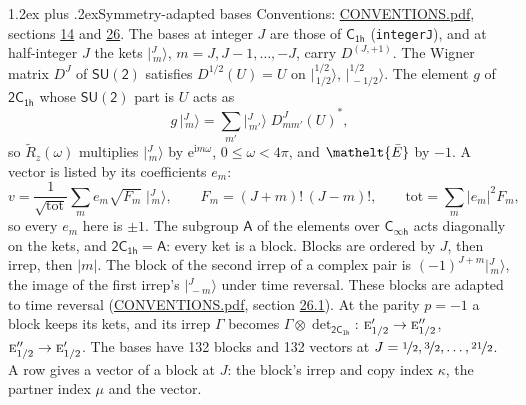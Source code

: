 \documentclass[10pt,a4paper]{article}
\makeatletter
\renewcommand\section{\@startsection{section}{1}{\z@}{-3ex plus -1ex minus -.2ex}%
  {1.2ex plus .2ex}{\normalfont\large\sffamily\bfseries\color{parttitle}}}
\numberwithin{equation}{section}
\newcommand{\eltfont}[1]{{\let\sigma\eltsigma\mathelt{#1}}}
\newcommand{\grp}[1]{\mathsf{#1}}
\newcommand{\irr}[1]{\text{\normalfont\scshape #1}}
\newcommand{\elt}[1]{\eltfont{#1}}
\newcommand{\iunit}{\mathrm{i}}
\newcommand{\expe}{\mathrm{e}}
\newcommand{\irrJp}[2]{D^{(#1,#2)}}
\newcommand{\wignerD}[1]{D^{#1}}
\newcommand{\conj}[1]{{#1}^{*}}
\newcommand{\irrprod}{\otimes}
\newcommand{\mult}{\kappa}
\newcommand{\intx}{\mu}
\newcommand{\jm}[2]{\bigl\lvert{}^{#1}_{\,#2}\bigr\rangle}
\newcommand{\barred}[1]{\bar{#1}}
\newcommand{\lift}[1]{\tilde{#1}}
\makeatother
\begin{document}
\section{Symmetry-adapted bases}\label{s:bases}
Conventions: \href{../../CONVENTIONS.pdf}{CONVENTIONS.pdf}, sections \href{../../../rotation/CONVENTIONS.pdf\#conv.14}{14} and \href{../../CONVENTIONS.pdf\#conv.26}{26}.
\leavevmode\label{n:index.m}\label{n:vector.ket}The bases at integer $J$ are those of \href{../../../rotation/data/pdf/C1h.pdf}{$\grp{C_{1h}}$} (\texttt{integerJ}), and at half-integer $J$ the kets $\jm{J}{m}$, $m = J, J-1, \dots, -J$, carry $\irrJp{J}{+1}$. \label{n:matrix.wigner}The Wigner matrix $\wignerD{J}$ of $\grp{SU(2)}$ satisfies $\wignerD{1/2}(U) = U$ on $\jm{1/2}{1/2}$, $\jm{1/2}{-1/2}$. The element $g$ of $\grp{2C_{1h}}$ whose $\grp{SU(2)}$ part is $U$ acts as
\begin{equation}\label{e:action}g\,\jm{J}{m} = \sum_{m'} \jm{J}{m'}\; \conj{\wignerD{J}_{m m'}(U)},\end{equation}
so $\lift{R}_{z}(\omega)$ multiplies $\jm{J}{m}$ by $\expe^{\iunit m\omega}$, $0 \le \omega < 4\pi$, and $\elt{\barred{E}}$ by $-1$. \label{n:index.ketcoefficient}\label{n:vector.basis.symmetry}\label{n:index.ketweight}\label{n:index.total}A vector is listed by its coefficients $e_m$:
\begin{equation}\label{e:ket}v = \frac{1}{\sqrt{\mathrm{tot}}}\sum_m e_m\sqrt{F_m}\;\jm{J}{m},\qquad F_m = (J+m)!\,(J-m)!,\qquad \mathrm{tot} = \sum_m |e_m|^2F_m,\end{equation}
so every $e_m$ here is $\pm 1$.
\leavevmode\label{n:group.A}The subgroup $\grp{A}$ of the elements over $\grp{C_{\infty h}}$ acts diagonally on the kets, and $\grp{2C_{1h}} = \grp{A}$: every ket is a block. Blocks are ordered by $J$, then irrep, then $|m|$. The block of the second irrep of a complex pair is $(-1)^{J+m}\jm{J}{m}$, the image of the first irrep's $\jm{J}{-m}$ under time reversal. These blocks are adapted to time reversal (\href{../../CONVENTIONS.pdf}{CONVENTIONS.pdf}, section \href{../../CONVENTIONS.pdf\#conv.26.1}{26.1}).
\leavevmode\label{n:operator.determinant.character}At the parity $p = -1$ a block keeps its kets, and its irrep $\Gamma$ becomes $\Gamma \irrprod \det_{\grp{2C_{1h}}}$: $\irr{e}_{1/2}' \to \irr{e}_{1/2}''$, $\irr{e}_{1/2}'' \to \irr{e}_{1/2}'$.
The bases have 132 blocks and 132 vectors at $J = \nicefrac{1}{2}, \nicefrac{3}{2}, \dots, \nicefrac{21}{2}$. \label{n:index.copy}\label{n:head.vector}A row gives a vector of a block at $J$: the block's irrep and copy index $\mult$, the partner index $\intx$ and the vector.
\end{document}
